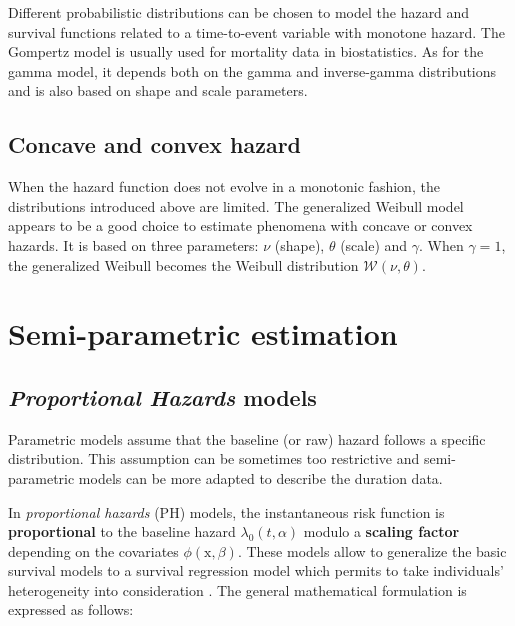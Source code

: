 \documentclass[
]{book}
\begin{document}
Different probabilistic distributions can be chosen to model the hazard and survival functions related to a time-to-event variable with monotone hazard. The Gompertz model is usually used for mortality data in biostatistics. As for the gamma model, it depends both on the gamma and inverse-gamma distributions and is also based on shape and scale parameters.

\hypertarget{concave-and-convex-hazard}{%
\subsection{Concave and convex hazard}\label{concave-and-convex-hazard}}

When the hazard function does not evolve in a monotonic fashion, the distributions introduced above are limited. The generalized Weibull model appears to be a good choice to estimate phenomena with concave or convex hazards. It is based on three parameters: \(\nu\) (shape), \(\theta\) (scale) and \(\gamma\). When \(\gamma = 1\), the generalized Weibull becomes the Weibull distribution \(\mathcal{W}(\nu, \theta)\).

\hypertarget{semi-parametric-estimation}{%
\section{Semi-parametric estimation}\label{semi-parametric-estimation}}

\hypertarget{proportional-hazards-models}{%
\subsection{\texorpdfstring{\emph{Proportional Hazards} models}{Proportional Hazards models}}\label{proportional-hazards-models}}

Parametric models assume that the baseline (or raw) hazard follows a specific distribution. This assumption can be sometimes too restrictive and semi-parametric models can be more adapted to describe the duration data.

In \emph{proportional hazards} (PH) models, the instantaneous risk function is \textbf{proportional} to the baseline hazard \(\lambda_0 (t,\alpha)\) modulo a \textbf{scaling factor} depending on the covariates \(\phi(\pmb{\mathrm{x}}, \beta)\). These models allow to generalize the basic survival models to a survival regression model which permits to take individuals' heterogeneity into consideration \citep{RMS}. The general mathematical formulation is expressed as follows:
\end{document}
